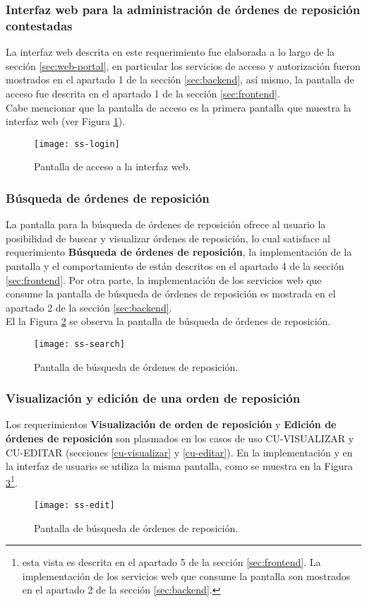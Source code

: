 \subsubsection{Interfaz web para la administración de órdenes de reposición contestadas}
La interfaz web descrita en este requerimiento fue elaborada a lo largo de la sección \ref{sec:web-portal}, en particular los servicios de acceso y autorización fueron mostrados en el apartado 1 de la sección \ref{sec:backend}, así mismo, la pantalla de acceso fue descrita en el apartado 1 de la sección \ref{sec:frontend}.\\
Cabe mencionar que la pantalla de acceso es la primera pantalla que muestra la interfaz web (ver Figura \ref{fig:ss-login}).
\begin{figure}[h]
	\centering
	\texttt{[image: ss-login]}
	\caption{Pantalla de acceso a la interfaz web.}
	\label{fig:ss-login}
\end{figure}

\subsubsection{Búsqueda de órdenes de reposición}
La pantalla para la búsqueda de órdenes de reposición ofrece al usuario la posibilidad de buscar y visualizar órdenes de reposición, lo cual satisface al requerimiento \textbf{Búsqueda de órdenes de reposición}, la implementación de la pantalla y el comportamiento de están descritos en el apartado 4 de la sección \ref{sec:frontend}. Por otra parte, la implementación de los servicios web que consume la pantalla de búsqueda de órdenes de reposición es mostrada en el apartado 2 de la sección \ref{sec:backend}.\\
El la Figura \ref{fig:ss-search} se observa la pantalla de búsqueda de órdenes de reposición.
\begin{figure}[h]
	\centering
	\texttt{[image: ss-search]}
	\caption{Pantalla de búsqueda de órdenes de reposición.}
	\label{fig:ss-search}
\end{figure}

\subsubsection{Visualización y edición de una orden de reposición}
Los requerimientos \textbf{Visualización de orden de reposición} y \textbf{Edición de órdenes de reposición} son plasmados en los casos de uso CU-VISUALIZAR y CU-EDITAR (secciones \ref{cu-visualizar} y \ref{cu-editar}). En la implementación y en la interfaz de usuario se utiliza la misma pantalla, como se muestra en la Figura \ref{fig:ss-edit}\footnote{esta vista es descrita en el apartado 5 de la sección \ref{sec:frontend}. La implementación de los servicios web que consume la pantalla son mostrados en el apartado 2 de la sección \ref{sec:backend}.}.
\begin{figure}[h]
	\centering
	\texttt{[image: ss-edit]}
	\caption{Pantalla de búsqueda de órdenes de reposición.}
	\label{fig:ss-edit}
\end{figure}

